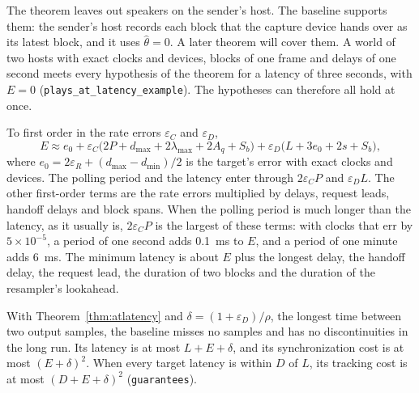 \documentclass[11pt,a4paper]{article}
\newcommand{\lean}[1]{\texttt{#1}}
\theoremstyle{definition}
\begin{document}
The theorem leaves out speakers on the sender's host. The baseline supports
them: the sender's host records each block that the capture device hands
over as its latest block, and it uses $\hat\theta = 0$. A later theorem will
cover them. A world of two hosts with exact clocks and devices, blocks of
one frame and delays of one second meets every hypothesis of the theorem for
a latency of three seconds, with $E = 0$
(\lean{plays\_at\_latency\_example}). The hypotheses can therefore all hold
at once.

To first order in the rate errors $\varepsilon_C$ and $\varepsilon_D$,
\[
  E \approx e_0 + \varepsilon_C \bigl(2P + d_{\max} + 2\lambda_{\max} + 2A_q
    + S_b\bigr) + \varepsilon_D \bigl(L + 3e_0 + 2s + S_b\bigr),
\]
where $e_0 = 2\varepsilon_R + (d_{\max} - d_{\min})/2$ is the target's error
with exact clocks and devices. The polling period and the latency enter
through $2\varepsilon_C P$ and $\varepsilon_D L$. The other first-order
terms are the rate errors multiplied by delays, request leads, handoff
delays and block spans. When the polling period is much longer than the
latency, as it usually is, $2\varepsilon_C P$ is the largest of these terms:
with clocks that err by $5 \times 10^{-5}$, a period of one second adds
0.1~ms to $E$, and a period of one minute adds 6~ms. The minimum latency is
about $E$ plus the longest delay, the handoff delay, the request lead, the
duration of two blocks and the duration of the resampler's lookahead.

With Theorem~\ref{thm:atlatency} and $\delta = (1 + \varepsilon_D)/\rho$,
the longest time between two output samples, the baseline misses no samples
and has no discontinuities in the long run. Its latency is at most
$L + E + \delta$, and its synchronization cost is at most
$(E + \delta)^2$. When every target latency is within $D$ of $L$, its
tracking cost is at most $(D + E + \delta)^2$ (\lean{guarantees}).
\end{document}
